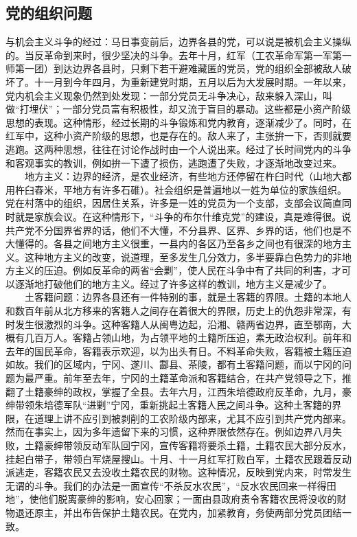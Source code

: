 \documentclass[cn,11pt,chinese]{elegantbook}
\def\myformat#1{\hfil\hfil #1}
\begin{document}
\subsection*{\myformat{党的组织问题}}
与机会主义斗争的经过：马日事变前后，边界各县的党，可以说是被机会主义操纵的。当反革命到来时，很少坚决的斗争。去年十月，红军（工农革命军第一军第一师第一团）到达边界各县时，只剩下若干避难藏匿的党员，党的组织全部被敌人破坏了。十一月到今年四月，为重新建党时期，五月以后为大发展时期。一年以来，党内机会主义现象仍然到处发现：一部分党员无斗争决心，敌来躲入深山，叫做“打埋伏”；一部分党员富有积极性，却又流于盲目的暴动。这些都是小资产阶级思想的表现。这种情形，经过长期的斗争锻炼和党内教育，逐渐减少了。同时，在红军中，这种小资产阶级的思想，也是存在的。敌人来了，主张拚一下，否则就要逃跑。这两种思想，往往在讨论作战时由一个人说出来。经过了长时间党内的斗争和客观事实的教训，例如拚一下遭了损伤，逃跑遭了失败，才逐渐地改变过来。\\
　　地方主义：边界的经济，是农业经济，有些地方还停留在杵臼时代（山地大都用杵臼舂米，平地方有许多石碓）。社会组织是普遍地以一姓为单位的家族组织。党在村落中的组织，因居住关系，许多是一姓的党员为一个支部，支部会议简直同时就是家族会议。在这种情形下，“斗争的布尔什维克党”的建设，真是难得很。说共产党不分国界省界的话，他们不大懂，不分县界、区界、乡界的话，他们也是不大懂得的。各县之间地方主义很重，一县内的各区乃至各乡之间也有很深的地方主义。这种地方主义的改变，说道理，至多发生几分效力，多半要靠白色势力的非地方主义的压迫。例如反革命的两省“会剿”，使人民在斗争中有了共同的利害，才可以逐渐地打破他们的地方主义。经过了许多这样的教训，地方主义是减少了。\\
　　土客籍问题：边界各县还有一件特别的事，就是土客籍的界限。土籍的本地人和数百年前从北方移来的客籍人之间存在着很大的界限，历史上的仇怨非常深，有时发生很激烈的斗争。这种客籍人从闽粤边起，沿湘、赣两省边界，直至鄂南，大概有几百万人。客籍占领山地，为占领平地的土籍所压迫，素无政治权利。前年和去年的国民革命，客籍表示欢迎，以为出头有日。不料革命失败，客籍被土籍压迫如故。我们的区域内，宁冈、遂川、酃县、茶陵，都有土客籍问题，而以宁冈的问题为最严重。前年至去年，宁冈的土籍革命派和客籍结合，在共产党领导之下，推翻了土籍豪绅的政权，掌握了全县。去年六月，江西朱培德政府反革命，九月，豪绅带领朱培德军队“进剿”宁冈，重新挑起土客籍人民之间斗争。这种土客籍的界限，在道理上讲不应引到被剥削的工农阶级内部来，尤其不应引到共产党内部来。然而在事实上，因为多年遗留下来的习惯，这种界限依然存在。例如边界八月失败，土籍豪绅带领反动军队回宁冈，宣传客籍将要杀土籍，土籍农民大部分反水，挂起白带子，带领白军烧屋搜山。十月、十一月红军打败白军，土籍农民跟着反动派逃走，客籍农民又去没收土籍农民的财物。这种情况，反映到党内来，时常发生无谓的斗争。我们的办法是一面宣传“不杀反水农民”，“反水农民回来一样得田地”，使他们脱离豪绅的影响，安心回家；一面由县政府责令客籍农民将没收的财物退还原主，并出布告保护土籍农民。在党内，加紧教育，务使两部分党员团结一致。\\
\end{document}
